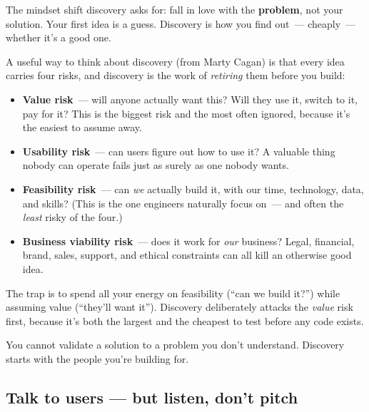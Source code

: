 \noindent{}The mindset shift discovery asks for: fall in love with the \textbf{problem}, not your solution. Your
first idea is a guess. Discovery is how you find out~--- cheaply~--- whether it's a good one.

\label{product-discovery:the-four-risks-every-idea-must-survive}

A useful way to think about discovery (from Marty Cagan) is that every idea carries four risks, and
discovery is the work of \emph{retiring} them before you build:

\begin{itemize}
\tightlist
\item
  \textbf{Value risk}~--- will anyone actually want this? Will they use it, switch to it, pay for it? This
  is the biggest risk and the most often ignored, because it's the easiest to assume away.
\item
  \textbf{Usability risk}~--- can users figure out how to use it? A valuable thing nobody can operate
  fails just as surely as one nobody wants.
\item
  \textbf{Feasibility risk}~--- can \emph{we} actually build it, with our time, technology, data, and skills?
  (This is the one engineers naturally focus on~--- and often the \emph{least} risky of the four.)
\item
  \textbf{Business viability risk}~--- does it work for \emph{our} business? Legal, financial, brand, sales,
  support, and ethical constraints can all kill an otherwise good idea.
\end{itemize}

\noindent{}The trap is to spend all your energy on feasibility (``can we build it?'') while assuming value
(``they'll want it''). Discovery deliberately attacks the \emph{value} risk first, because it's both the
largest and the cheapest to test before any code exists.

\label{product-discovery:understanding-the-problem-and-the-user}

You cannot validate a solution to a problem you don't understand. Discovery starts with the people
you're building for.

\subsection*{Talk to users --- but listen, don't pitch}\label{product-discovery:talk-to-users--but-listen-dont-pitch}

